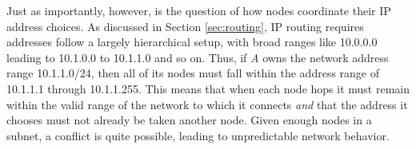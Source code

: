 \par Just as importantly, however, is the question of how nodes coordinate their IP address choices. As discussed in Section \ref{sec:routing}, IP routing requires addresses follow a largely hierarchical setup, with broad ranges like 10.0.0.0 leading to 10.1.0.0 to 10.1.1.0 and so on. Thus, if \textit{A} owns the network address range 10.1.1.0/24, then all of its nodes must fall within the address range of 10.1.1.1 through 10.1.1.255. This means that when each node hops it must remain within the valid range of the network to which it connects \textit{and} that the address it chooses must not already be taken another node. Given enough nodes in a subnet, a conflict is quite possible, leading to unpredictable network behavior. 



